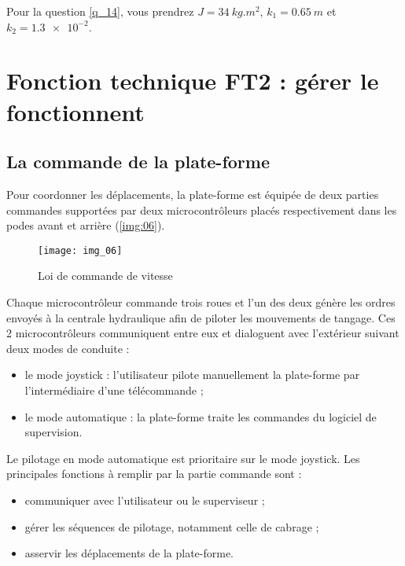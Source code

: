 Pour la question \ref{q_14}, vous prendrez $J =\SI{34}{kg.m^2}$, $k_1 =\SI{0,65}{m}$ et $k_2 = \num{1,3e-2}$.



\section{Fonction technique FT2 : gérer le fonctionnent}

\subsection{La commande de la plate-forme}

Pour coordonner les déplacements, la plate-forme est équipée de deux parties commandes supportées par deux microcontrôleurs placés respectivement dans les podes avant et arrière (\autoref{img:06}).

\begin{figure}[H]
\centering
\texttt{[image: img\_06]}
\caption{Loi de commande de vitesse \label{img:06}}
\end{figure}

Chaque microcontrôleur commande trois roues et l’un des deux génère les ordres envoyés à la centrale hydraulique afin de piloter les mouvements de tangage. Ces 2 microcontrôleurs communiquent entre eux et dialoguent avec l’extérieur suivant deux modes de conduite :
\begin{itemize}
\item le mode joystick : l’utilisateur pilote manuellement la plate-forme par l’intermédiaire d’une télécommande ;
\item le mode automatique : la plate-forme traite les commandes du logiciel de supervision.
\end{itemize}
Le pilotage en mode automatique est prioritaire sur le mode joystick. 
Les principales fonctions à remplir par la partie commande sont :
\begin{itemize}
\item communiquer avec l’utilisateur ou le superviseur ;
\item gérer les séquences de pilotage, notamment celle de cabrage ;
\item asservir les déplacements de la plate-forme.
\end{itemize}

